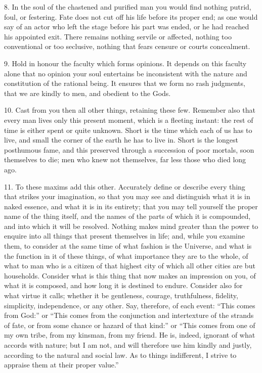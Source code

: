 \documentclass{book}
\begin{document}
8. In the soul of the chastened and purified man you would find
nothing putrid, foul, or festering. Fate does not cut off his life
before its proper end; as one would say of an actor who left the stage
before his part was ended, or he had reached his appointed exit. There
remains nothing servile or affected, nothing too conventional or too
seclusive, nothing that fears censure or courts concealment.

9. Hold in honour the faculty which forms opinions. It depends on this
faculty alone that no opinion your soul entertains be inconsistent
with the nature and constitution of the rational being. It ensures
that we form no rash judgments, that we are kindly to men, and
obedient to the Gods.

10. Cast from you then all other things, retaining these few. Remember
also that every man lives only this present moment, which is a
fleeting instant: the rest of time is either spent or quite
unknown. Short is the time which each of us has to live, and small the
corner of the earth he has to live in.  Short is the longest
posthumous fame, and this preserved through a succession of poor
mortals, soon themselves to die; men who knew not themselves, far less
those who died long ago.

11. To these maxims add this other. Accurately define or describe
every thing that strikes your imagination, so that you may see and
distinguish what it is in naked essence, and what it is in its
entirety; that you may tell yourself the proper name of the thing
itself, and the names of the parts of which it is compounded, and into
which it will be resolved. Nothing makes mind greater than the power
to enquire into all things that present themselves in life; and, while
you examine them, to consider at the same time of what fashion is the
Universe, and what is the function in it of these things, of what
importance they are to the whole, of what to man who is a citizen of
that highest city of which all other cities are but households.
Consider what is this thing that now makes an impression on you, of
what it is composed, and how long it is destined to endure. Consider
also for what virtue it calls; whether it be gentleness, courage,
truthfulness, fidelity, simplicity, independence, or any other. Say,
therefore, of each event: ``This comes from God:'' or ``This comes from
the conjunction and intertexture of the strands of fate, or from some
chance or hazard of that kind:'' or ``This comes from one of my own
tribe, from my kinsman, from my friend. He is, indeed, ignorant of
what accords with nature; but I am not, and will therefore use him
kindly and justly, according to the natural and social law. As to
things indifferent, I strive to appraise them at their proper value.''
\end{document}
